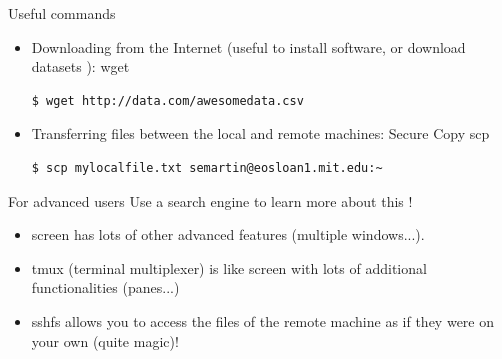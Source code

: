 \documentclass{beamer}
\begin{document}
\begin{frame}[fragile]{Useful commands}
  \begin{itemize}
  \item Downloading from the Internet (useful to install software, or download datasets ): \alert{wget}
  \begin{verbatim}
$ wget http://data.com/awesomedata.csv
  \end{verbatim}
  \item Transferring files between the local and remote machines: Secure Copy \alert{scp}
  \begin{verbatim}
$ scp mylocalfile.txt semartin@eosloan1.mit.edu:~
  \end{verbatim}

  \end{itemize}

  \pause

  \begin{block}{For advanced users}
    Use a search engine to learn more about this !
    \begin{itemize}
      \item \alert{screen} has lots of other advanced features (multiple windows...).
      \item \alert{tmux} (terminal multiplexer) is like screen with lots of additional functionalities (panes...)
      \item \alert{sshfs} allows you to access the files of the remote machine as if they were on your own (quite magic)!
    \end{itemize}
  \end{block}
\end{frame}
\end{document}

